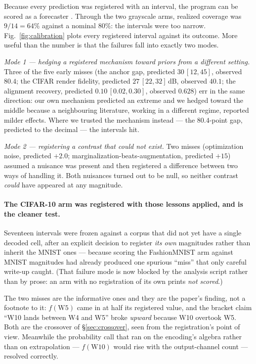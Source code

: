 \documentclass[10pt,letterpaper]{article}
\theoremstyle{definition}
\begin{document}
Because every prediction was registered with an interval, the program can be scored as a
forecaster \citep{gneiting2007scoring}. Through the two grayscale arms, realized coverage was
$9/14 = 64\%$ against a nominal $80\%$: the intervals were too narrow. Fig.~\ref{fig:calibration}
plots every registered interval against its outcome. More useful than the number is that the
failures fall into exactly two modes.

\emph{Mode 1 --- hedging a registered mechanism toward priors from a different setting.} Three of
the five early misses (the anchor gap, predicted $30\,[12,45]$, observed $80.4$; the CIFAR render
fidelity, predicted $27\,[22,32]$\,dB, observed $40.1$; the alignment recovery, predicted
$0.10\,[0.02,0.30]$, observed $0.628$) err in the same direction: our own mechanism predicted an
extreme and we hedged toward the middle because a neighbouring literature, working in a different
regime, reported milder effects. Where we trusted the mechanism instead --- the $80.4$-point gap,
predicted to the decimal --- the intervals hit.

\emph{Mode 2 --- registering a contrast that could not exist.} Two misses (optimization noise,
predicted $+2.0$; marginalization-beats-augmentation, predicted $+15$) assumed a nuisance was
present and then registered a difference between two ways of handling it. Both nuisances turned
out to be null, so neither contrast \emph{could} have appeared at any magnitude.

\paragraph{The CIFAR-10 arm was registered with those lessons applied, and is the cleaner test.}
Seventeen intervals were frozen against a corpus that did not yet have a single decoded cell,
after an explicit decision to register \emph{its own} magnitudes rather than inherit the MNIST
ones --- because scoring the FashionMNIST arm against MNIST magnitudes had already produced one
spurious ``miss'' that only careful write-up caught. (That failure mode is now blocked by the
analysis script rather than by prose: an arm with no registration of its own prints
\emph{not scored}.) 

The two misses are the informative ones and they are the paper's finding, not a footnote to it:
$f(\mathrm{W5})$ came in at half its registered value, and the bracket claim ``W10 lands between
W4 and W5'' broke \emph{upward} because W10 overtook W5. Both are the crossover of
\S\ref{sec:crossover}, seen from the registration's point of view. Meanwhile the probability call
that ran on the encoding's algebra rather than on extrapolation --- $f(\mathrm{W10})$ would rise
with the output-channel count --- resolved correctly.
\end{document}

